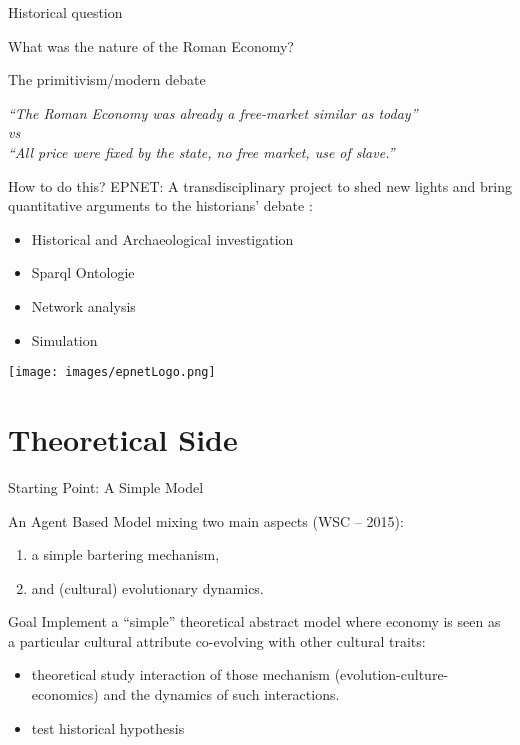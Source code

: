 \documentclass[8pt, handout=show,notes=show]{beamer}
\begin{document}
\begin{frame}{Historical question}
	\begin{center}
		\Huge
		What was the nature of the Roman Economy?\\
	\end{center}
	\vfill
	\begin{block}
		{The primitivism/modern debate}
		\begin{center}
		    \em
		    ``The Roman Economy was already a free-market similar as today'' \\
		    \emph{vs}\\
		    ``All price were fixed by the state, no free market, use of slave.''
		\end{center}
	\end{block}
\end{frame}
\begin{frame}{How to do this?}
	EPNET:	A transdisciplinary project to shed new lights and bring quantitative arguments to the historians' debate :
	\begin{itemize}
		\item Historical and Archaeological investigation
		\item Sparql Ontologie
		\item Network analysis
		\item Simulation
	\end{itemize}
	\begin{center}
		\texttt{[image: images/epnetLogo.png]}
	\end{center}
	
\end{frame}
\section{Theoretical Side}
\begin{frame}{Starting Point: A Simple Model}

	An Agent Based Model mixing two main aspects (WSC -- 2015):

	\vfil
	\begin{enumerate}
		\item a	simple bartering mechanism,
		\item and (cultural) evolutionary dynamics.
	\end{enumerate}

	\vfill
	\begin{alertblock}{Goal}
	    Implement a ``simple'' theoretical abstract model where economy is seen as a particular cultural attribute co-evolving with other cultural traits:
	    \begin{itemize}
		\item theoretical study interaction of those mechanism (evolution-culture-economics) and the dynamics of such interactions.
		\item test historical hypothesis
	    \end{itemize}
	\end{alertblock}

\end{frame}
\end{document}
